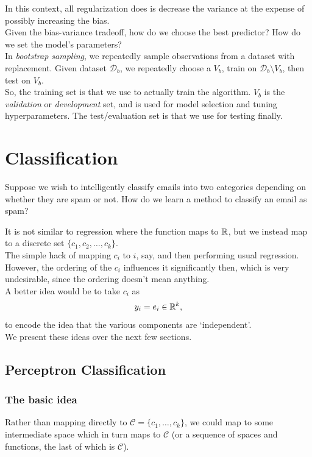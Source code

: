 \documentclass{article}
\begin{document}
			In this context, all regularization does is decrease the variance at the expense of possibly increasing the bias.\\

			Given the bias-variance tradeoff, how do we choose the best predictor? How do we set the model's parameters?\\
			In \emph{bootstrap sampling}, we repeatedly sample observations from a dataset with replacement. Given dataset $\mathcal{D}_b$, we repeatedly choose a $V_b$, train on $\mathcal{D}_b \setminus V_b$, then test on $V_b$.\\
			So, the training set is that we use to actually train the algorithm. $V_b$ is the \emph{validation} or \emph{development} set, and is used for model selection and tuning hyperparameters. The test/evaluation set is that we use for testing finally.

\clearpage

\section{Classification}

	Suppose we wish to intelligently classify emails into two categories depending on whether they are spam or not. How do we learn a method to classify an email as spam?

	It is not similar to regression where the function maps to $\mathbb{R}$, but we instead map to a discrete set $\{c_1,c_2,\ldots,c_k\}$.\\
	The simple hack of mapping $c_i$ to $i$, say, and then performing usual regression. However, the ordering of the $c_i$ influences it significantly then, which is very undesirable, since the ordering doesn't mean anything.\\
	A better idea would be to take $c_i$ as
	\[ y_i = e_i \in \mathbb{R}^k, \]
	to encode the idea that the various components are `independent'.\\
	We present these ideas over the next few sections.

	\subsection{Perceptron Classification}

		\subsubsection{The basic idea}

			Rather than mapping directly to $\mathcal{C} = \{c_1,\ldots,c_k\}$, we could map to some intermediate space which in turn maps to $\mathcal{C}$ (or a sequence of spaces and functions, the last of which is $\mathcal{C}$).\\
\end{document}
